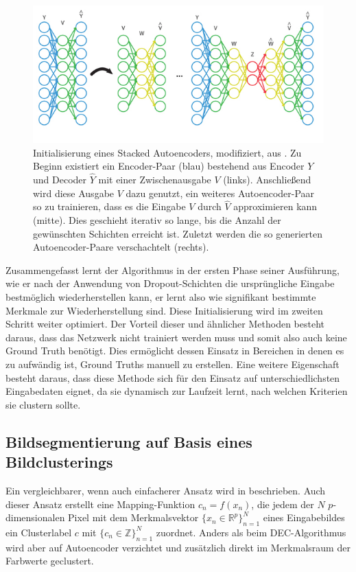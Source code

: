 \begin{figure}[h!]
	\centering
	\includegraphics[width=.8\textwidth,keepaspectratio]{images/BK15/BK15_01.png}
	\caption{Initialisierung eines Stacked Autoencoders, modifiziert, aus \cite{berniker_15}. Zu Beginn existiert ein Encoder-Paar (blau) bestehend aus Encoder $Y$ und Decoder $\hat{Y}$ mit einer Zwischenausgabe $V$ (links). Anschließend wird diese Ausgabe $V$ dazu genutzt, ein weiteres Autoencoder-Paar so zu trainieren, dass es die Eingabe $V$ durch $\hat{V}$ approximieren kann (mitte). Dies geschieht iterativ so lange, bis die Anzahl der gewünschten Schichten erreicht ist. Zuletzt werden die so generierten Autoencoder-Paare verschachtelt (rechts).}
	\label{fig:sae}
\end{figure}

Zusammengefasst lernt der Algorithmus in der ersten Phase seiner Ausführung, wie er nach der Anwendung von Dropout-Schichten die ursprüngliche Eingabe bestmöglich wiederherstellen kann, er lernt also wie signifikant bestimmte Merkmale zur Wiederherstellung sind. Diese Initialisierung wird im zweiten Schritt weiter optimiert.
Der Vorteil dieser und ähnlicher Methoden besteht daraus, dass das Netzwerk nicht trainiert werden muss und somit also auch keine Ground Truth benötigt. Dies ermöglicht dessen Einsatz in Bereichen in denen es zu aufwändig ist, Ground Truths manuell zu erstellen. Eine weitere Eigenschaft besteht daraus, dass diese Methode sich für den Einsatz auf unterschiedlichsten Eingabedaten eignet, da sie dynamisch zur Laufzeit lernt, nach welchen Kriterien sie clustern sollte.

\subsection{Bildsegmentierung auf Basis eines Bildclusterings}
\label{ssec:kanezaki}
Ein vergleichbarer, wenn auch einfacherer Ansatz wird in \cite{kanezaki_18} beschrieben. Auch dieser Ansatz erstellt eine Mapping-Funktion $c_n=f(x_n)$, die jedem der $N$ $p$-dimensionalen Pixel mit dem Merkmalsvektor $\{x_n\in\mathbb{R}^p\}_{n=1}^N$ eines Eingabebildes ein Clusterlabel $c$ mit $\{c_n\in\mathbb{Z}\}_{n=1}^N$ zuordnet. Anders als beim DEC-Algorithmus wird aber auf Autoencoder verzichtet und zusätzlich direkt im Merkmalsraum der Farbwerte geclustert.

